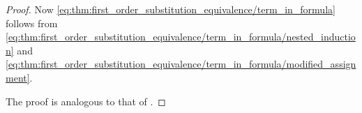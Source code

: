 \begin{proof}
  Now \eqref{eq:thm:first_order_substitution_equivalence/term_in_formula} follows from \eqref{eq:thm:first_order_substitution_equivalence/term_in_formula/nested_induction} and \eqref{eq:thm:first_order_substitution_equivalence/term_in_formula/modified_assignment}.

   The proof is analogous to that of .
\end{proof}
